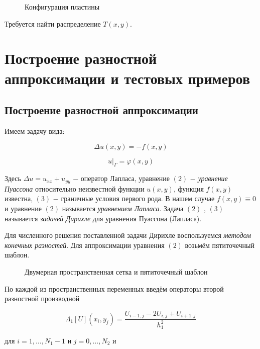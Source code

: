 \documentclass[a4paper, 12pt]{article} %
\begin{document}
\begin{figure}[h]
\caption{Конфигурация пластины}
\end{figure}

Требуется найти распределение $ T(x, y) $.

\section{Построение разностной аппроксимации и тестовых примеров}

\subsection{Построение разностной аппроксимации}

Имеем задачу вида:

\begin{equation}
\Delta u(x, y) = -f(x, y)
\end{equation}

\begin{equation}
u|_{\Gamma} = \varphi (x, y)
\end{equation}

Здесь $ \Delta u = u_{xx} + u_{yy} $ $ - $ оператор Лапласа, уравнение $ (2) $ $ - $ \textit{уравнение Пуассона} относительно неизвестной функции $ u(x, y)$, функция $ f(x, y) $ известна, $ (3) $ $ - $ граничные условия первого рода. В нашем случае $ f(x, y) \equiv 0 $ и уравнение $ (2) $ называется \textit{уравнением Лапласа}. Задача $ (2) $ , $ (3) $ называется \textit{задачей Дирихле} для уравнения Пуассона (Лапласа). 

Для численного решения поставленной задачи Дирихле воспользуемся \textit{методом конечных разностей}. Для аппроксимации уравнения $ (2) $ возьмём пятиточечный шаблон.

\newpage

\begin{figure}[h]
\caption{Двумерная пространственная сетка и пятиточечный шаблон}
\end{figure}

По каждой из пространственных переменных введём операторы второй разностной производной 

\[ \Lambda_1[U](x_i, y_j) = \frac{U_{i - 1, j} - 2 U_{i, j} + U_{i + 1, j}}{h^2_{1}} \]

для $ i = 1, \dots, N_1 - 1 $ и $ j = 0, \dots, N_2 $ и
\end{document}

